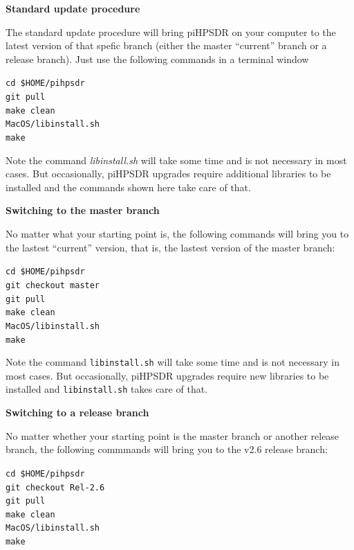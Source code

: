 \documentclass[12pt]{book}
\def\grtt#1{\texttt{\color{magenta}#1}}
\def\pH{pi\-HPSDR\xspace}
\begin{document}
\medskip
\textbf{Standard update procedure}

The standard update procedure will bring \pH on your computer to the latest version of
that spefic branch (either the master ``current'' branch or a release branch).
Just use the following commands in a terminal window

\grtt{cd \$HOME/pihpsdr} \\
\grtt{git pull} \\
\grtt{make clean} \\
\grtt{MacOS/libinstall.sh} \\
\grtt{make}

Note the command \textit{libinstall.sh} will take some time and is not necessary in most cases. But occasionally,
\pH upgrades require additional libraries to be installed and the commands shown here take care of that.

\medskip
\textbf{Switching to the master branch}

No matter what your starting point is, the following commands will bring you to the
lastest ``current'' version, that is, the lastest version of the master branch:

\grtt{cd \$HOME/pihpsdr} \\
\grtt{git checkout master} \\
\grtt{git pull} \\
\grtt{make clean} \\
\grtt{MacOS/libinstall.sh} \\
\grtt{make}

Note the command \texttt{libinstall.sh} will take some time and is not necessary in most cases. But occasionally,
\pH upgrades require new libraries to be installed and \texttt{libinstall.sh} takes care of that.

\medskip
\textbf{Switching to a release branch}

No matter whether your starting point is the master branch or another release branch, the following
commmands will bring you to  the v2.6 release branch:

\grtt{cd \$HOME/pihpsdr} \\
\grtt{git checkout Rel-2.6} \\
\grtt{git pull} \\
\grtt{make clean} \\
\grtt{MacOS/libinstall.sh} \\
\grtt{make}

\end{document}
